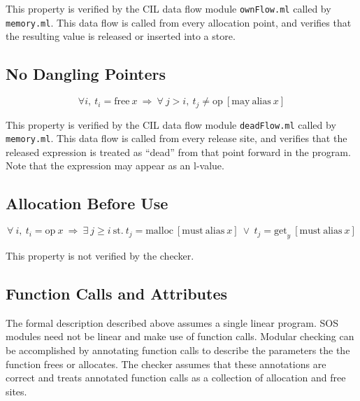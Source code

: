 \documentclass{article}
\begin{document}
This property is verified by the CIL data flow module \texttt{ownFlow.ml} called
by \texttt{memory.ml}.  This data flow is called from every allocation point,
and verifies that the resulting value is released or inserted into a store.

\subsection{No Dangling Pointers}

\begin{displaymath}
%
\forall i, \ t_{i} = \mathrm{free} \ x \ 
%
\Rightarrow \
%
\forall \ j > i, \ t_{j} \neq \mathrm{op} \ [\mathrm{may \ alias} \ x] 
%
\end{displaymath}

This property is verified by the CIL data flow module \texttt{deadFlow.ml}
called by \texttt{memory.ml}.  This data flow is called from every release
site, and verifies that the released expression is treated as ``dead'' from
that point forward in the program.  Note that the expression may appear as an
l-value.

\subsection{Allocation Before Use}
\label{ss_alloc_before}

\begin{displaymath}
%
\forall \ i, \ t_{i} = \mathrm{op} \ x \ 
%
\Rightarrow \
%
\exists \ j \geq i \ 
%
\mathrm{st.} \
%
t_{j} = \mathrm{malloc} \ [\mathrm{must \ alias} \ x] \ 
%
\vee \ t_{j} = \mathrm{get}_{y} \ [\mathrm{must \ alias} \ x] 
\end{displaymath}

This property is not verified by the checker.

\subsection{Function Calls and Attributes}

The formal description described above assumes a single linear program.  SOS
modules need not be linear and make use of function calls.  Modular checking
can be accomplished by annotating function calls to describe the parameters
the the function frees or allocates.  The checker assumes that these
annotations are correct and treats annotated function calls as a collection of
allocation and free sites.
\end{document}
